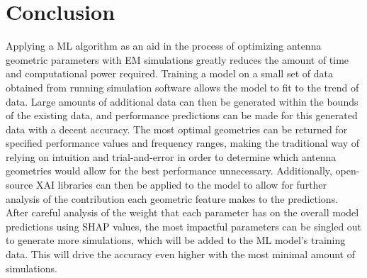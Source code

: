 \documentclass[conference]{IEEEtran}
\begin{document}
\section{Conclusion}
Applying a ML algorithm as an aid in the process of optimizing antenna geometric parameters with EM simulations greatly reduces the amount of time and computational power required. Training a model on a small set of data obtained from running simulation software allows the model to fit to the trend of data. Large amounts of additional data can then be generated within the bounds of the existing data, and performance predictions can be made for this generated data with a decent accuracy. The most optimal geometries can be returned for specified performance values and frequency ranges, making the traditional way of relying on intuition and trial-and-error in order to determine which antenna geometries would allow for the best performance unnecessary. Additionally, open-source XAI libraries can then be applied to the model to allow for further analysis of the contribution each geometric feature makes to the predictions. After careful analysis of the weight that each parameter has on the overall model predictions using SHAP values, the most impactful parameters can be singled out to generate more simulations, which will be added to the ML model's training data. This will drive the accuracy even higher with the most minimal amount of simulations. 





\vfill
\end{document}
